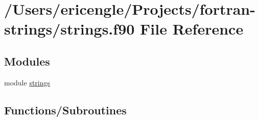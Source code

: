\hypertarget{strings_8f90}{}\section{/\+Users/ericengle/\+Projects/fortran-\/strings/strings.f90 File Reference}
\label{strings_8f90}
\subsection*{Modules}
\begin{DoxyCompactItemize}
\item 
module \mbox{\hyperlink{namespacestrings}{strings}}
\end{DoxyCompactItemize}
\subsection*{Functions/\+Subroutines}
